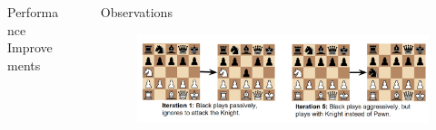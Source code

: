 \documentclass[final]{beamer}
\newlength{\sepwid}
\newlength{\onecolwid}
\newlength{\twocolwid}
\begin{document}
\begin{frame}[t]
\begin{columns}[t]
\begin{column}{\twocolwid}
\begin{columns}[t,totalwidth=\twocolwid]
\begin{column}{\onecolwid}
\begin{block}{Performance Improvements}
\end{block}


\end{column} %

\end{columns} %





\begin{columns}[t,totalwidth=\twocolwid] %




\end{columns} %

\end{column} %

\begin{column}{\sepwid}\end{column} %

\begin{column}{\onecolwid} %



\begin{block}{Observations}

\begin{figure}
\includegraphics[width=1.0\linewidth]{attack_1.png}
\end{figure}



\end{block}
\end{column}
\end{columns}
\end{frame}
\end{document}
